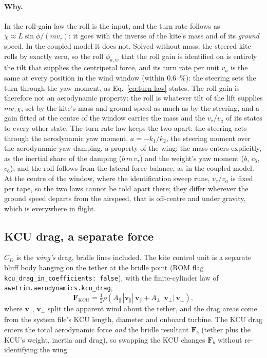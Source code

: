 \documentclass[11pt,a4paper]{article}
\newcommand{\code}[1]{\texttt{\small #1}}
\begin{document}
\paragraph{Why.} In the roll-gain law the roll is the input, and the turn rate follows
as $\dot\chi\approx L\sin\phi/(m v_\tau)$: it goes with the inverse of the kite's mass
and of its \emph{ground} speed. In the coupled model it does not. Solved without mass,
the steered kite rolls by exactly zero, so the roll $\phi_{a,w}$ that the roll gain is
identified on is entirely the tilt that supplies the centripetal force, and its turn rate
per unit $v_a$ is the same at every position in the wind window (within
\SI{0.6}{\percent}): the steering sets the turn through the yaw moment, as
Eq.~\eqref{eq:turn-law} states. The roll gain is therefore not an aerodynamic
property: the roll is whatever tilt of the lift supplies $m v_\tau\dot\chi$, set by the
kite's mass and ground speed as much as by the steering, and a gain fitted at the centre
of the window carries the mass and the $v_\tau/v_a$ of its states to every other state.
The turn-rate law keeps the two apart: the steering acts through the aerodynamic yaw
moment, $a=-k_1/k_2$, the steering moment over the aerodynamic yaw damping, a property
of the wing; the mass enters explicitly, as the inertial share of the damping
($b\,m\,v_\tau$) and the weight's yaw moment ($b$, $c_5$, $c_6$); and the roll follows
from the lateral force balance, as in the coupled model. At the centre of the window, where the identification
sweep runs, $v_\tau/v_a$ is fixed per tape, so the two laws cannot be told apart there;
they differ wherever the ground speed departs from the airspeed, that is off-centre and
under gravity, which is everywhere in flight.

\subsection{KCU drag, a separate force}
$C_D$ is the \emph{wing's} drag, bridle lines included. The kite control unit
is a separate bluff body hanging on the tether at the bridle point (ROM flag
\code{kcu\_drag\_in\_coefficients: false}), with the finite-cylinder law of
\code{awetrim.aerodynamics.kcu\_drag},
\begin{equation}
  \mathbf F_\mathrm{KCU}=\tfrac12\rho\left(A_\parallel\,|\mathbf v_\parallel|\,\mathbf v_\parallel
  + A_\perp\,|\mathbf v_\perp|\,\mathbf v_\perp\right),
\end{equation}
where $\mathbf v_\parallel$, $\mathbf v_\perp$ split the apparent wind about the
tether, and the drag areas come from the system file's KCU length, diameter and
onboard turbine. The KCU drag enters the total aerodynamic force \emph{and} the
bridle resultant $\mathbf F_b$ (tether plus the KCU's weight, inertia and drag),
so swapping the KCU changes $\mathbf F_b$ without re-identifying the wing.
\end{document}
